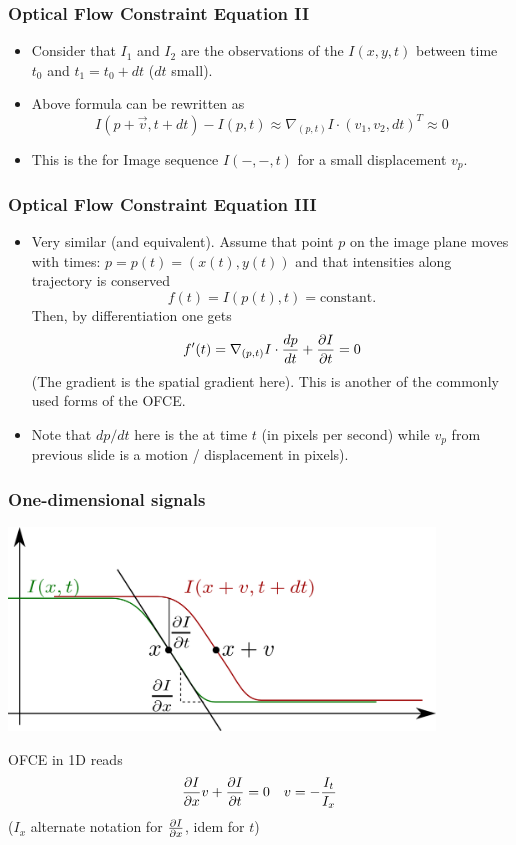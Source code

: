\documentclass[10pt]{beamer}
\newcommand{\myemph}[1]{{\color{blue}{#1}}}
\begin{document}
\begin{frame}
  \frametitle{Optical Flow Constraint Equation II}
  \begin{itemize}
  \item Consider that $I_1$ and $I_2$ are the observations of the
    \myemph{Image Sequence} $I(x,y,t)$ between time $t_0$ and $t_1 =
    t_0 + dt$ ($dt$ small). 
  \item Above formula can be rewritten as
    $$
    I(p+\vec{v},t+dt) -I(p,t) \approx \nabla_{(p,t)} I\cdot (v_1,v_2,dt)^T \approx 0
    $$
  \item This is the \myemph{Optical Flow Constraint Equation (OFCE)}
    for Image sequence $I(-,-,t)$ for a small displacement $v_p$.
  \end{itemize}
\end{frame}


\begin{frame}
  \frametitle{Optical Flow Constraint Equation III}
  \begin{itemize}
  \item Very similar (and equivalent). Assume that point $p$ on the
    image plane moves with times: $p = p(t) = (x(t), y(t))$ and that intensities along trajectory is conserved
    $$
    f(t) = I(p(t), t) = \text{constant}.
    $$
    Then, by differentiation one gets
    $$
    f'(t) = \nabla_{(p,t)}I\cdot \frac{d{p}}{d{t}} + \frac{\partial{I}}{\partial{t}} = 0
    $$
    (The gradient is the spatial gradient here).  This is another of
    the commonly used forms of the OFCE.
  \item Note that $dp/dt$ here is the \myemph{instantaneous velocity} at
    time $t$ (in pixels per second) while $v_p$ from previous slide is a motion
    / displacement in pixels).
  \end{itemize}
\end{frame}


\begin{frame}
  \frametitle{One-dimensional signals}
  \begin{center}
    \includegraphics[width=0.85\textwidth]{FIGURES/OFCE1D}
  \end{center}
  OFCE in 1D reads 
  $$
  \frac{\partial{I}}{\partial{x}}v + \frac{\partial{I}}{\partial{t}} = 0 \quad v = -\frac{I_t}{I_x}
  $$
  ($I_x$ alternate notation for $\frac{\partial{I}}{\partial{x}}$, idem for $t$)
\end{frame}
\end{document}
